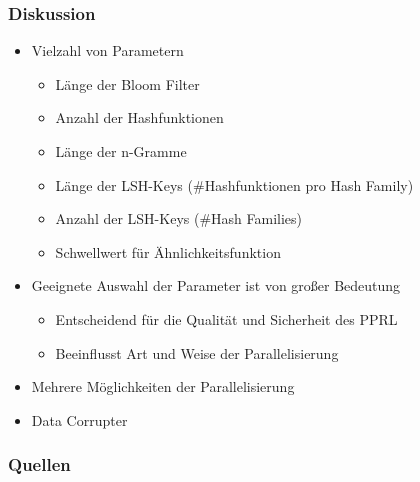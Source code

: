 \documentclass{beamer}
\begin{document}
    \begin{frame}
    		\frametitle{Diskussion}
    		\begin{itemize}
    			\item Vielzahl von Parametern
    			\begin{itemize}
    				\item Länge der Bloom Filter
    				\item Anzahl der Hashfunktionen
    				\item Länge der n-Gramme
    				\item Länge der LSH-Keys (\#Hashfunktionen pro Hash Family)
    				\item Anzahl der LSH-Keys (\#Hash Families)
    				\item Schwellwert für Ähnlichkeitsfunktion
    			\end{itemize}
    			\item Geeignete Auswahl der Parameter ist von großer Bedeutung
    			\begin{itemize}
    				\item Entscheidend für die Qualität und Sicherheit des PPRL
    				\item Beeinflusst Art und Weise der Parallelisierung
    			\end{itemize}
    			\item Mehrere Möglichkeiten der Parallelisierung
                \item Data Corrupter
    		\end{itemize}
    \end{frame}
     
     \begin{frame}
     	\frametitle{Quellen}
      	
      	
	\end{frame}
     
\end{document}
